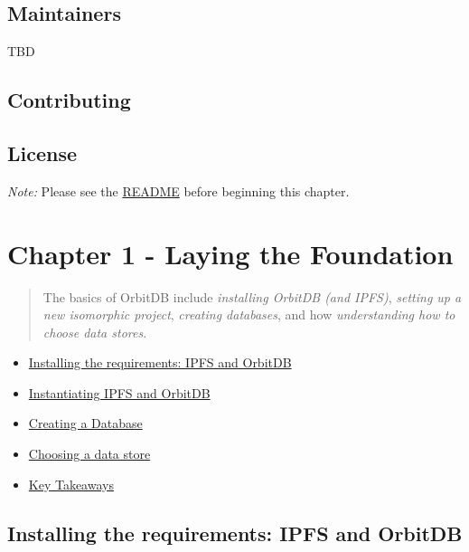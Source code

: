 \subsection{Maintainers}\label{maintainers}

TBD

\subsection{Contributing}\label{contributing}

\subsection{License}\label{license}

\emph{Note:} Please see the \href{./README.md}{README} before beginning
this chapter.

\section{Chapter 1 - Laying the
Foundation}\label{chapter-1---laying-the-foundation}

\begin{quote}
The basics of OrbitDB include \emph{installing OrbitDB (and IPFS)},
\emph{setting up a new isomorphic project}, \emph{creating databases},
and how \emph{understanding how to choose data stores}.
\end{quote}

\begin{itemize}
\tightlist
\item
  \protect\hyperlink{installing-the-requirements-ipfs-and-orbitdb}{Installing
  the requirements: IPFS and OrbitDB}
\item
  \protect\hyperlink{instantiating-ipfs-and-orbitdb}{Instantiating IPFS
  and OrbitDB}
\item
  \protect\hyperlink{creating-a-database}{Creating a Database}
\item
  \protect\hyperlink{choosing-a-data-store}{Choosing a data store}
\item
  \protect\hyperlink{key-takeaways}{Key Takeaways}
\end{itemize}

\hypertarget{installing-the-requirements-ipfs-and-orbitdb}{\subsection{Installing
the requirements: IPFS and
OrbitDB}\label{installing-the-requirements-ipfs-and-orbitdb}}

